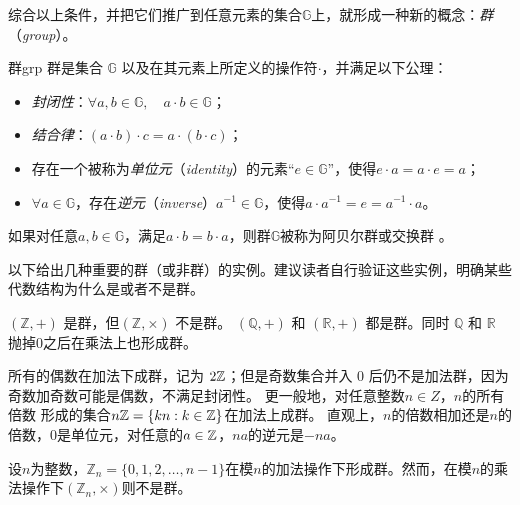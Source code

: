 综合以上条件，并把它们推广到任意元素的集合$\mathbb{G}$上，就形成一种新的概念：\emph{群}（\emph{group}）。
	
\begin{definition}{群}{grp}
群是集合 $\mathbb{G}$ 以及在其元素上所定义的操作符$\cdot$，并满足以下公理：
	\begin{itemize}
		\item \emph{封闭性}：$\forall a,b \in \mathbb{G}, \quad a\cdot b \in \mathbb{G}$；
		
		\item \emph{结合律}：$(a\cdot b)\cdot c = a\cdot (b\cdot c)$；
		
		\item 存在一个被称为\emph{单位元}（\emph{identity}）的元素“$e\in \mathbb{G}$”，使得$e\cdot a = a \cdot e = a$；
		
		\item $\forall a \in \mathbb{G}$，存在\emph{逆元}（\emph{inverse}）$a^{-1}\in \mathbb{G}$，使得$a\cdot a^{-1} = e = a^{-1} \cdot a$。
	\end{itemize}
如果对任意$a, b\in \mathbb{G}$，满足$a \cdot b = b \cdot a$，则群$\mathbb{G}$被称为阿贝尔群或交换群 。
\end{definition}
	
以下给出几种重要的群（或非群）的实例。建议读者自行验证这些实例，明确某些代数结构为什么是或者不是群。
\begin{example}
 $(\mathbb{Z}, +)$ 是群，但$(\mathbb{Z}, \times)$ 不是群。
  $(\mathbb{Q}, +)$ 和 $(\mathbb{R}, +)$ 都是群。同时 $\mathbb{Q}$ 和 $\mathbb{R}$ 抛掉$0$之后在乘法上也形成群。
\end{example}

\begin{example}
 所有的偶数在加法下成群，记为 $2{\mathbb Z}$；但是奇数集合并入 $0$ 后仍不是加法群，因为奇数加奇数可能是偶数，不满足封闭性。
 更一般地，对任意整数$n \in Z$，$n$的所有倍数
 形成的集合$n{\mathbb Z} =\{ kn : k \in {\mathbb Z}\}$在加法上成群。
 直观上，$n$的倍数相加还是$n$的倍数，$0$是单位元，对任意的$a\in {\mathbb Z}$，$na$的逆元是$-na$。
\end{example}
	
\begin{example}%
设$n$为整数，$\mathbb{Z}_n = \{0, 1, 2, \ldots, n-1\}$在模$n$的加法操作下形成群。然而，在模$n$的乘法操作下$(\mathbb{Z}_n, \times)$则不是群。
\end{example}

